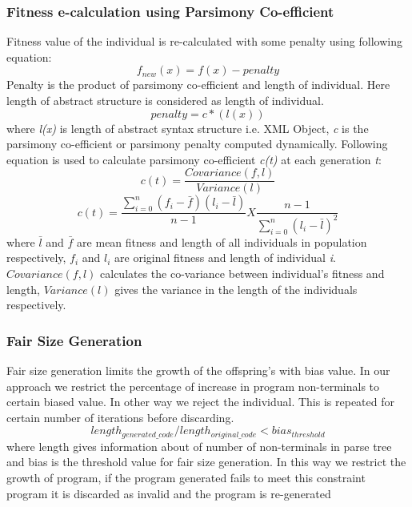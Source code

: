 \documentclass{acm_proc_article-sp}
\begin{document}
\subsubsection*{\textbf{Fitness e-calculation using Parsimony Co-efficient}} \label{p_co-ef}
Fitness value of the individual is re-calculated with some penalty using following equation:
\[f_{new}(x) = f(x) - penalty  \]
Penalty is the product of parsimony co-efficient and length of individual. Here length of abstract structure is considered as length of individual.
\[penalty = c*(l(x))\]
where \textit{l(x)} is length of abstract syntax structure i.e. XML Object, \textit{c} is the parsimony co-efficient or parsimony penalty computed dynamically. Following equation is used to calculate parsimony co-efficient \textit{c(t)} at each generation \textit{t}:
\[ c(t) = \frac{Covariance(f,l)}{Variance(l)}\]
\[ c(t) = \frac{\sum_{i=0}^{n}(f_{i}-\bar{f})(l_{i}-\bar{l})}{n-1} X  \frac{n-1}{\sum_{i=0}^{n}(l_{i}-\bar{l})^2}\]
where $\bar{l}$ and $\bar{f}$ are mean fitness and length of all individuals in population respectively, $f_{i}$ and $l_{i}$ are original fitness and length of individual \textit{i}.\\
\indent $Covariance(f,l)$ calculates the co-variance between individual's fitness and length, $Variance(l)$ gives the variance in the length of the individuals respectively.

\subsubsection*{\textbf{Fair Size Generation}}
Fair size generation limits the growth of the offspring's with bias value. In our approach we restrict the percentage of increase in program non-terminals to certain biased value. In other way we reject the individual. This is repeated for certain number of iterations before discarding. 
\[length_{generated\_code}/length_{original\_code} < bias_{threshold}\]
\indent where length gives information about of number of non-terminals in parse tree and bias is the threshold value for fair size generation. In this way we restrict the growth of program, if the program generated fails to meet this constraint program it is discarded as invalid and the program is re-generated
\end{document}
